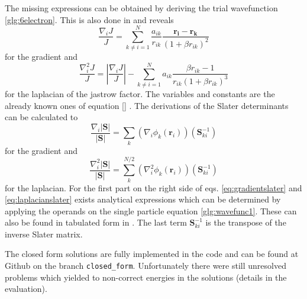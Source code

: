 The missing expressions can be obtained by deriving the trial wavefunction \ref{glg:6electron}. This is also done in \citet{hogberget2013} and reveals 
\begin{equation}\label{eq:jastrow-derivations}
    \frac{\nabla_i J}{J} = \sum_{k\neq i = 1}^{N}\frac{a_{ik}}{r_{ik}} \frac{\mathbf{r_i}-\mathbf{r_k}}{\left(1 + \beta r_{ik} \right)^2}
\end{equation}
for the gradient and 
\begin{equation}
    \frac{\nabla_i^2 J}{J} = \left| \frac{\nabla_i J}{J} \right| - \sum_{k\neq i = 1}^{N}a_{ik} \frac{\beta r_{ik} - 1}{r_{ik}\left(1 +\beta r_{ik} \right)^3} 
\end{equation}
for the laplacian of the jastrow factor. The variables and constants are the already known ones of equation \ref{} . The derivations of the Slater determinants can be calculated to
\begin{equation}\label{eq:gradientslater}
    \frac{\nabla_i |\mathbf{S}|}{|\mathbf{S}|} = \sum_k \left( \nabla_i \phi_k(\mathbf{r}_i)\right)(\mathbf{S}_{ki}^{-1})
\end{equation}
for the gradient and
\begin{equation}\label{eq:laplacianslater}
    \frac{\nabla_i^2 |\mathbf{S}|}{|\mathbf{S}|} = \sum_k^{N/2} \left( \nabla_i^2 \phi_k(\mathbf{r}_i)\right)(\mathbf{S}_{ki}^{-1})
\end{equation}
for the laplacian. For the first part on the right side of eqs. \ref{eq:gradientslater} and \ref{eq:laplacianslater} exists analytical expressions which can be determined by applying the operands on the single particle equation \ref{glg:wavefunc1}. These can also be found in tabulated form in \citet[app. D]{hogberget2013}. The last term $\mathbf{S}_{ki}^{-1}$ is the transpose of the inverse Slater matrix. 

The closed form solutions are fully implemented in the code and can be found at Github on the branch \texttt{closed\_form}. Unfortunately there were still unresolved problems which yielded to non-correct energies in the solutions (details in the evaluation). 
